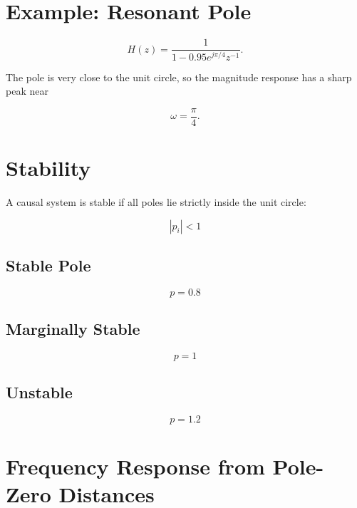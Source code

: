 \section{Example: Resonant Pole}

\[
H(z)=
\frac{1}{1-0.95e^{j\pi/4}z^{-1}}.
\]

The pole is very close to the unit circle, so the magnitude response has a sharp
peak near

\[
\omega=\frac{\pi}{4}.
\]


\section{Stability}

A causal system is stable if all poles lie strictly inside the unit circle:

\[
\boxed{
|p_i|<1
}
\]


\subsection{Stable Pole}

\[
p=0.8
\]


\subsection{Marginally Stable}

\[
p=1
\]


\subsection{Unstable}

\[
p=1.2
\]


\section{Frequency Response from Pole-Zero Distances}

